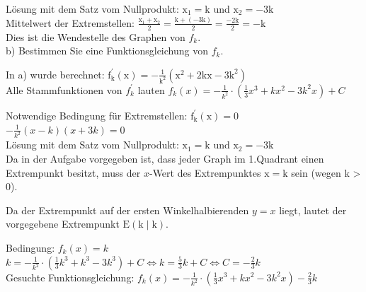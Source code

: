 \documentclass[10pt]{article}
\begin{document}
Lösung mit dem Satz vom Nullprodukt: $\mathrm{x}_{1}=\mathrm{k}$ und $\mathrm{x}_{2}=-3 \mathrm{k}$\\
Mittelwert der Extremstellen: $\frac{\mathrm{x}_{1}+\mathrm{x}_{2}}{2}=\frac{\mathrm{k}+(-3 \mathrm{k})}{2}=\frac{-2 \mathrm{k}}{2}=-\mathrm{k}$\\
Dies ist die Wendestelle des Graphen von $f_{k}$.\\
b) Bestimmen Sie eine Funktionsgleichung von $f_{k}$.

In a) wurde berechnet: $\mathrm{f}_{\mathrm{k}}^{\prime}(\mathrm{x})=-\frac{1}{\mathrm{k}^{2}}\left(\mathrm{x}^{2}+2 \mathrm{kx}-3 \mathrm{k}^{2}\right)$\\
Alle Stammfunktionen von $f_{k}^{\prime}$ lauten $f_{k}(x)=-\frac{1}{k^{2}} \cdot\left(\frac{1}{3} x^{3}+k x^{2}-3 k^{2} x\right)+C$

Notwendige Bedingung für Extremstellen: $\mathrm{f}_{\mathrm{k}}^{\prime}(\mathrm{x})=0$\\
$-\frac{1}{k^{2}}(x-k)(x+3 k)=0$\\
Lösung mit dem Satz vom Nullprodukt: $\mathrm{x}_{1}=\mathrm{k}$ und $\mathrm{x}_{2}=-3 \mathrm{k}$\\
Da in der Aufgabe vorgegeben ist, dass jeder Graph im 1.Quadrant einen Extrempunkt besitzt, muss der $x$-Wert des Extrempunktes $\mathrm{x}=\mathrm{k}$ sein (wegen k > 0).

Da der Extrempunkt auf der ersten Winkelhalbierenden $y=x$ liegt, lautet der vorgegebene Extrempunkt $\mathrm{E}(\mathrm{k} \mid \mathrm{k})$.

Bedingung: $f_{k}(x)=k$\\
$k=-\frac{1}{k^{2}} \cdot\left(\frac{1}{3} k^{3}+k^{3}-3 k^{3}\right)+C \Leftrightarrow k=\frac{5}{3} k+C \Leftrightarrow C=-\frac{2}{3} k$\\
Gesuchte Funktionsgleichung: $f_{k}(x)=-\frac{1}{k^{2}} \cdot\left(\frac{1}{3} x^{3}+k x^{2}-3 k^{2} x\right)-\frac{2}{3} k$
\end{document}
